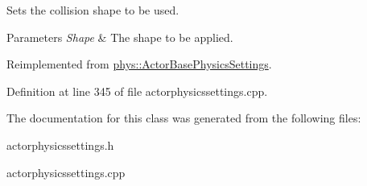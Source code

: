 Sets the collision shape to be used. 


\begin{DoxyParams}{Parameters}
{\em Shape} & The shape to be applied. \\
\hline
\end{DoxyParams}


Reimplemented from \hyperlink{classphys_1_1ActorBasePhysicsSettings_a1509c654724bcb6499ec1e5058ab5185}{phys::ActorBasePhysicsSettings}.



Definition at line 345 of file actorphysicssettings.cpp.



The documentation for this class was generated from the following files:\begin{DoxyCompactItemize}
\item 
actorphysicssettings.h\item 
actorphysicssettings.cpp\end{DoxyCompactItemize}
